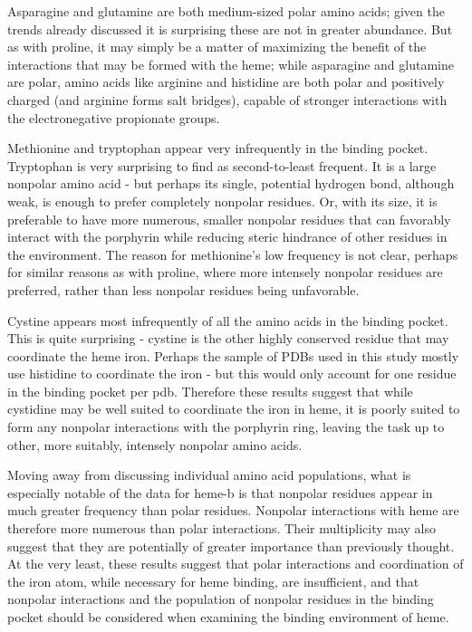 \documentclass[a4paper, nobind]{templates/ociamthesis}
\begin{document}
Asparagine and glutamine are both medium-sized polar amino acids; given the trends already discussed it is surprising these are not in greater abundance. But as with proline, it may simply be a matter of maximizing the benefit of the interactions that may be formed with the heme; while asparagine and glutamine are polar, amino acids like arginine and histidine are both polar and positively charged (and arginine forms salt bridges), capable of stronger interactions with the electronegative propionate groups.

Methionine and tryptophan appear very infrequently in the binding pocket. Tryptophan is very surprising to find as second-to-least frequent. It is a large nonpolar amino acid - but perhaps its single, potential hydrogen bond, although weak, is enough to prefer completely nonpolar residues. Or, with its size, it is preferable to have more numerous, smaller nonpolar residues that can favorably interact with the porphyrin while reducing steric hindrance of other residues in the environment. The reason for methionine's low frequency is not clear, perhaps for similar reasons as with proline, where more intensely nonpolar residues are preferred, rather than less nonpolar residues being unfavorable.

Cystine appears most infrequently of all the amino acids in the binding pocket. This is quite surprising - cystine is the other highly conserved residue that may coordinate the heme iron. Perhaps the sample of PDBs used in this study mostly use histidine to coordinate the iron - but this would only account for one residue in the binding pocket per pdb. Therefore these results suggest that while cystidine may be well suited to coordinate the iron in heme, it is poorly suited to form any nonpolar interactions with the porphyrin ring, leaving the task up to other, more suitably, intensely nonpolar amino acids.

Moving away from discussing individual amino acid populations, what is especially notable of the data for heme-b is that nonpolar residues appear in much greater frequency than polar residues. Nonpolar interactions with heme are therefore more numerous than polar interactions. Their multiplicity may also suggest that they are potentially of greater importance than previously thought. At the very least, these results suggest that polar interactions and coordination of the iron atom, while necessary for heme binding, are insufficient, and that nonpolar interactions and the population of nonpolar residues in the binding pocket should be considered when examining the binding environment of heme.
\end{document}
